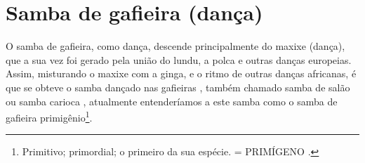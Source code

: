 \section{Samba de gafieira (dança)}
O samba de gafieira, como dança, descende principalmente do maxixe (dança),
que a sua vez foi gerado  pela união do  lundu, 
a polca e outras danças europeias.
Assim, misturando o maxixe com a ginga, e o ritmo de outras danças africanas, 
é que se obteve o samba dançado nas gafieiras \cite[pp. 139]{perna2002samba}, também chamado
samba de salão ou samba carioca \cite[pp. 50]{fornaciari1947aprender},
atualmente entenderíamos a este samba como o samba de gafieira primigênio\footnote{
Primitivo; primordial; o primeiro da sua espécie. = PRIMÍGENO \cite{priberamprimigenio}.
}.




